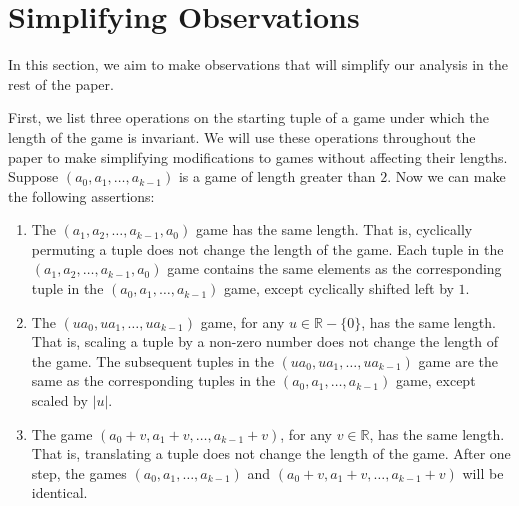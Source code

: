 \documentclass[12pt]{amsart}
\newtheorem{definition}[theorem]{Definition}
\newcommand{\breathe}{\vspace{0.2cm}}
\newcommand{\znn}{\mathbb{N}}
\begin{document}
%
%
%
%
%

\section{Simplifying Observations\label{sec:invariants}}

In this section, we aim to make observations that will simplify our analysis in the rest of the paper.

First, we list three operations on the starting tuple of a game under which the length of the game is invariant. We will use these operations throughout the paper to make simplifying modifications to games without affecting their lengths. Suppose $(a_0, a_1, \dots, a_{k-1})$ is a game of length greater than $2$. Now we can make the following assertions:

\begin{enumerate}
\item The $(a_1,a_2, \dots, a_{k-1}, a_0)$ game has the same length. That is, cyclically permuting a tuple does not change the length of the game. Each tuple in the $(a_1,a_2, \dots, a_{k-1}, a_0)$ game contains the same elements as the corresponding tuple in the $(a_0, a_1, \dots, a_{k-1})$ game, except cyclically shifted left by $1$. \\
\item The $(ua_0, ua_1, \dots, ua_{k-1})$ game, for any $u \in \mathbb{R} - \{0\}$, has the same length. That is, scaling a tuple by a non-zero number does not change the length of the game. The subsequent tuples in the $(ua_0, ua_1, \dots, ua_{k-1})$ game are the same as the corresponding tuples in the $(a_0, a_1, \dots, a_{k-1})$ game, except scaled by $|u|$. \\
\item The game $(a_0 + v, a_1 + v, \dots, a_{k-1} + v)$, for any $v \in \mathbb{R}$, has the same length. That is, translating a tuple does not change the length of the game. After one step, the games $(a_0, a_1, \dots, a_{k-1})$ and $(a_0 + v, a_1 + v, \dots, a_{k-1} + v)$ will be identical.
\end{enumerate}
\end{document}

